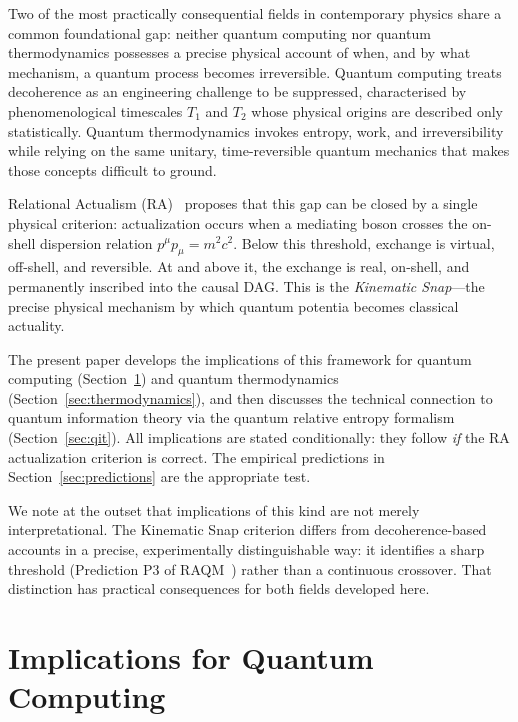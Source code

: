 \documentclass[11pt,a4paper]{article}
\theoremstyle{plain}
\theoremstyle{definition}
\theoremstyle{remark}
\begin{document}
Two of the most practically consequential fields in contemporary physics share a
common foundational gap: neither quantum computing nor quantum thermodynamics
possesses a precise physical account of when, and by what mechanism, a quantum
process becomes irreversible. Quantum computing treats decoherence as an
engineering challenge to be suppressed, characterised by phenomenological
timescales $T_1$ and $T_2$ whose physical origins are described only
statistically. Quantum thermodynamics invokes entropy, work, and irreversibility
while relying on the same unitary, time-reversible quantum mechanics that makes
those concepts difficult to ground.

Relational Actualism (RA)~\citep{Sandeman2026a,Sandeman2026RAGC,Sandeman2026RACI}
proposes that this gap can be closed by a single physical criterion: actualization
occurs when a mediating boson crosses the on-shell dispersion relation
$p^\mu p_\mu = m^2c^2$. Below this threshold, exchange is virtual, off-shell,
and reversible. At and above it, the exchange is real, on-shell, and permanently
inscribed into the causal DAG. This is the \emph{Kinematic Snap}---the precise
physical mechanism by which quantum potentia becomes classical actuality.

The present paper develops the implications of this framework for quantum computing
(Section~\ref{sec:computing}) and quantum thermodynamics
(Section~\ref{sec:thermodynamics}), and then discusses the technical connection
to quantum information theory via the quantum relative entropy formalism
(Section~\ref{sec:qit}). All implications are stated conditionally: they follow
\emph{if} the RA actualization criterion is correct. The empirical predictions
in Section~\ref{sec:predictions} are the appropriate test.

We note at the outset that implications of this kind are not merely
interpretational. The Kinematic Snap criterion differs from decoherence-based
accounts in a precise, experimentally distinguishable way: it identifies a sharp
threshold (Prediction P3 of RAQM~\citep{Sandeman2026a}) rather than a continuous
crossover. That distinction has practical consequences for both fields developed
here.

\section{Implications for Quantum Computing}
\label{sec:computing}
\end{document}
